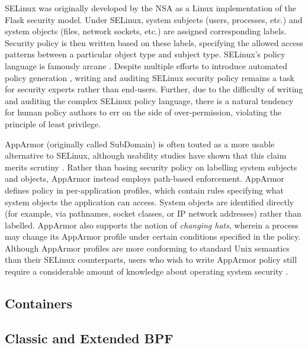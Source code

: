 SELinux \cite{smalley2001_selinux} was originally developed by the NSA as a Linux implementation of the Flask \cite{spencer1999_flask} security model.  Under SELinux, system subjects (users, processes, etc.) and system objects (files, network sockets, etc.) are assigned corresponding labels. Security policy is then written based on these labels, specifying the allowed access patterns between a particular object type and subject type. SELinux's policy language is famously arcane \cite{schreuders12_towards}. Despite multiple efforts to introduce automated policy generation \cite{audit2allow, macmillan07_madison, sniffen06_guided}, writing and auditing SELinux security policy remains a task for security experts rather than end-users. Further, due to the difficulty of writing and auditing the complex SELinux policy language, there is a natural tendency for human policy authors to err on the side of over-permission, violating the principle of least privilege.

AppArmor (originally called SubDomain) \cite{cowan2000_apparmor} is often touted as a more usable alternative to SELinux, although usability studies have shown that this claim merits scrutiny \cite{schreuders12_towards}. Rather than basing security policy on labelling system subjects and objects, AppArmor instead employs path-based enforcement. AppArmor defines policy in per-application profiles, which contain rules specifying what system objects the application can access. System objects are identified directly (for example, via pathnames, socket classes, or IP network addresses) rather than labelled.  AppArmor also supports the notion of \textit{changing hats}, wherein a process may change its AppArmor profile under certain conditions specified in the policy.  Although AppArmor profiles are more conforming to standard Unix semantics than their SELinux counterparts, users who wish to write AppArmor policy still require a considerable amount of knowledge about operating system security \cite{schreuders12_towards}.

\subsection{Containers}
\label{subsection:containers}


\subsection{Classic and Extended BPF}

